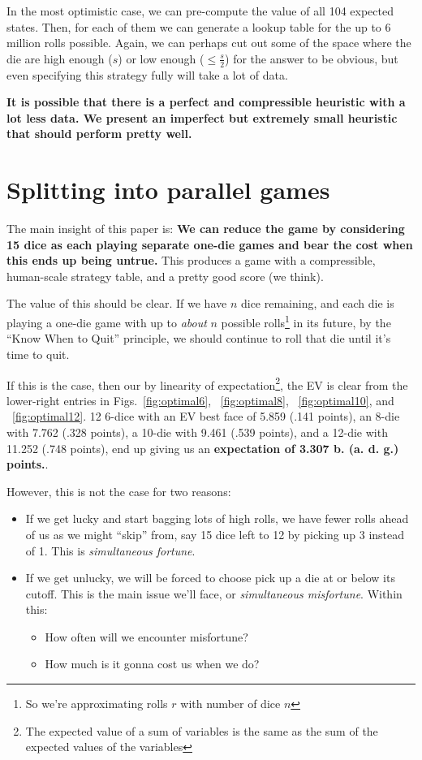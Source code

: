 \documentclass[11pt, oneside]{article} 	%
\begin{document}
In the most optimistic case, we can pre-compute the value of all 104 expected states. Then, for each of them we can generate a lookup table for the up to 6 million rolls possible. Again, we can perhaps cut out some of the space where the die are high enough ($s$) or low enough ($\leq \frac{s}{2}$) for the answer to be obvious, but even specifying this strategy fully will take a lot of data. 

\textbf{It is possible that there is a perfect and compressible heuristic with a lot less data. We present an imperfect but extremely small heuristic that should perform pretty well.}

\section{Splitting into parallel games} \label{section:split-out}

The main insight of this paper is: \textbf{We can reduce the game by considering 15 dice as each playing separate one-die games and bear the cost when this ends up being untrue.}  This produces a game with a compressible, human-scale strategy table, and a pretty good score (we think).

The value of this should be clear. If we have $n$ dice remaining, and each die is playing a one-die game with up to \emph{about} $n$ possible rolls\footnote{So we're approximating rolls $r$ with number of dice $n$} in its future, by the ``Know When to Quit'' principle, we should continue to roll that die until it's time to quit.

If this is the case, then our by linearity of expectation\footnote{The expected value of a sum of variables is the same as the sum of the expected values of the variables}, the EV is clear from the lower-right entries in Figs.~\ref{fig:optimal6}, ~\ref{fig:optimal8}, ~\ref{fig:optimal10}, and ~\ref{fig:optimal12}. 12 6-dice with an EV best face of 5.859 (.141 points), an 8-die with 7.762 (.328 points), a 10-die with 9.461 (.539 points), and a 12-die with 11.252 (.748 points), end up giving us an \textbf{expectation of 3.307 b. (a. d. g.) points.}.

However, this is not the case for two reasons:
\begin{itemize}
\item If we get lucky and start bagging lots of high rolls, we have fewer rolls ahead of us as we might ``skip'' from, say 15 dice left to 12 by picking up 3 instead of 1. This is \emph{simultaneous fortune}.
\item If we get unlucky, we will be forced to choose pick up a die at or below its cutoff. This is the main issue we'll face, or \emph{simultaneous misfortune}. Within this:
  \begin{itemize}
  \item How often will we encounter misfortune?
  \item How much is it gonna cost us when we do?
  \end{itemize}
\end{itemize}
\end{document}
